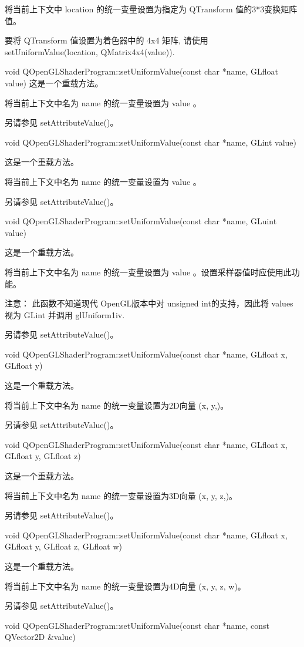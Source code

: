 将当前上下文中 location 的统一变量设置为指定为 QTransform 值的3*3变换矩阵值。

要将 QTransform 值设置为着色器中的 4x4 矩阵, 请使用 setUniformValue(location, QMatrix4x4(value)).

void QOpenGLShaderProgram::setUniformValue(const char *name, GLfloat value)
这是一个重载方法。

将当前上下文中名为 name 的统一变量设置为 value 。

另请参见 setAttributeValue()。

void QOpenGLShaderProgram::setUniformValue(const char *name, GLint value)

这是一个重载方法。

将当前上下文中名为 name 的统一变量设置为 value 。

另请参见 setAttributeValue()。

void QOpenGLShaderProgram::setUniformValue(const char *name, GLuint value)

这是一个重载方法。

将当前上下文中名为 name 的统一变量设置为 value 。设置采样器值时应使用此功能。

注意： 此函数不知道现代 OpenGL版本中对 unsigned int的支持，因此将 values 视为 GLint 并调用 glUniform1iv.

另请参见 setAttributeValue()。

void QOpenGLShaderProgram::setUniformValue(const char *name, GLfloat x, GLfloat y)

这是一个重载方法。

将当前上下文中名为 name 的统一变量设置为2D向量 (x, y,)。

另请参见 setAttributeValue()。

void QOpenGLShaderProgram::setUniformValue(const char *name, GLfloat x, GLfloat y, GLfloat z)

这是一个重载方法。

将当前上下文中名为 name 的统一变量设置为3D向量 (x, y, z,)。

另请参见 setAttributeValue()。

void QOpenGLShaderProgram::setUniformValue(const char *name, GLfloat x, GLfloat y, GLfloat z, GLfloat w)

这是一个重载方法。

将当前上下文中名为 name 的统一变量设置为4D向量 (x, y, z, w)。

另请参见 setAttributeValue()。

void QOpenGLShaderProgram::setUniformValue(const char *name, const QVector2D \&value)

